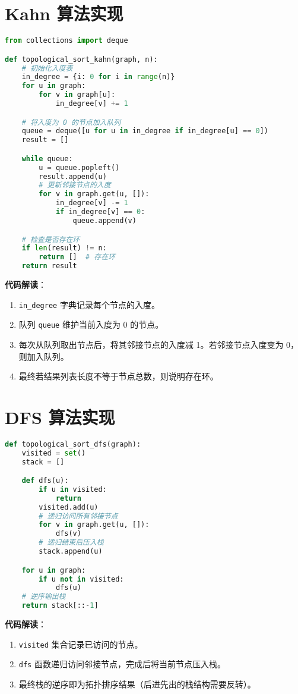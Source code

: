 \section{Kahn 算法实现}
\begin{lstlisting}[language=python]
from collections import deque

def topological_sort_kahn(graph, n):
    # 初始化入度表
    in_degree = {i: 0 for i in range(n)}
    for u in graph:
        for v in graph[u]:
            in_degree[v] += 1

    # 将入度为 0 的节点加入队列
    queue = deque([u for u in in_degree if in_degree[u] == 0])
    result = []

    while queue:
        u = queue.popleft()
        result.append(u)
        # 更新邻接节点的入度
        for v in graph.get(u, []):
            in_degree[v] -= 1
            if in_degree[v] == 0:
                queue.append(v)

    # 检查是否存在环
    if len(result) != n:
        return []  # 存在环
    return result
\end{lstlisting}
\textbf{代码解读}：\par
\begin{enumerate}
\item \verb!in_degree! 字典记录每个节点的入度。
\item 队列 \verb!queue! 维护当前入度为 0 的节点。
\item 每次从队列取出节点后，将其邻接节点的入度减 1。若邻接节点入度变为 0，则加入队列。
\item 最终若结果列表长度不等于节点总数，则说明存在环。
\end{enumerate}
\section{DFS 算法实现}
\begin{lstlisting}[language=python]
def topological_sort_dfs(graph):
    visited = set()
    stack = []

    def dfs(u):
        if u in visited:
            return
        visited.add(u)
        # 递归访问所有邻接节点
        for v in graph.get(u, []):
            dfs(v)
        # 递归结束后压入栈
        stack.append(u)

    for u in graph:
        if u not in visited:
            dfs(u)
    # 逆序输出栈
    return stack[::-1]
\end{lstlisting}
\textbf{代码解读}：\par
\begin{enumerate}
\item \verb!visited! 集合记录已访问的节点。
\item \verb!dfs! 函数递归访问邻接节点，完成后将当前节点压入栈。
\item 最终栈的逆序即为拓扑排序结果（后进先出的栈结构需要反转）。
\end{enumerate}
